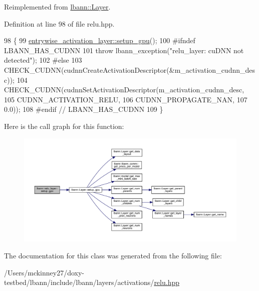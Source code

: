 Reimplemented from \hyperlink{classlbann_1_1Layer_a36aa22ef90ce4de65abe729d38490863}{lbann\+::\+Layer}.



Definition at line 98 of file relu.\+hpp.


\begin{DoxyCode}
98                             \{
99     \hyperlink{classlbann_1_1Layer_a36aa22ef90ce4de65abe729d38490863}{entrywise\_activation\_layer::setup\_gpu}();
100 \textcolor{preprocessor}{  #ifndef LBANN\_HAS\_CUDNN}
101     \textcolor{keywordflow}{throw} lbann\_exception(\textcolor{stringliteral}{"relu\_layer: cuDNN not detected"});
102 \textcolor{preprocessor}{  #else}
103     CHECK\_CUDNN(cudnnCreateActivationDescriptor(&m\_activation\_cudnn\_desc));
104     CHECK\_CUDNN(cudnnSetActivationDescriptor(m\_activation\_cudnn\_desc,
105                                              CUDNN\_ACTIVATION\_RELU,
106                                              CUDNN\_PROPAGATE\_NAN,
107                                              0.0));
108 \textcolor{preprocessor}{  #endif // LBANN\_HAS\_CUDNN}
109   \}
\end{DoxyCode}
Here is the call graph for this function\+:\nopagebreak
\begin{figure}[H]
\begin{center}
\leavevmode
\includegraphics[width=350pt]{classlbann_1_1relu__layer_a9426317aa741ab8a202ee52cf5250b59_cgraph}
\end{center}
\end{figure}


The documentation for this class was generated from the following file\+:\begin{DoxyCompactItemize}
\item 
/\+Users/mckinney27/doxy-\/testbed/lbann/include/lbann/layers/activations/\hyperlink{relu_8hpp}{relu.\+hpp}\end{DoxyCompactItemize}
